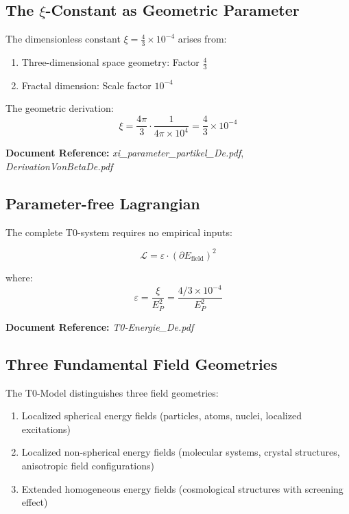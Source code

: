 \documentclass[12pt,a4paper]{article}
\newcommand{\xipar}{\xi}
\newcommand{\Efield}{E_{\text{field}}}
\begin{document}
	\subsection{The $\xipar$-Constant as Geometric Parameter}
	
	The dimensionless constant $\xipar = \frac{4}{3} \times 10^{-4}$ arises from:
	
	\begin{enumerate}
		\item Three-dimensional space geometry: Factor $\frac{4}{3}$
		\item Fractal dimension: Scale factor $10^{-4}$
	\end{enumerate}
	
	The geometric derivation:
	\begin{equation}
		\xipar = \frac{4\pi}{3} \cdot \frac{1}{4\pi \times 10^4} = \frac{4}{3} \times 10^{-4}
	\end{equation}
	
	\textbf{Document Reference:} \textit{xi\_parameter\_partikel\_De.pdf}, \textit{DerivationVonBetaDe.pdf}
	
	\subsection{Parameter-free Lagrangian}
	
	The complete T0-system requires no empirical inputs:
	
	\begin{equation}
		\mathcal{L} = \varepsilon \cdot (\partial \Efield)^2
	\end{equation}
	
	where:
	\begin{equation}
		\varepsilon = \frac{\xipar}{E_P^2} = \frac{4/3 \times 10^{-4}}{E_P^2}
	\end{equation}
	
	\textbf{Document Reference:} \textit{T0-Energie\_De.pdf}
	
	\subsection{Three Fundamental Field Geometries}
	
	The T0-Model distinguishes three field geometries:
	
	\begin{enumerate}
		\item Localized spherical energy fields (particles, atoms, nuclei, localized excitations)
		\item Localized non-spherical energy fields (molecular systems, crystal structures, anisotropic field configurations)
		\item Extended homogeneous energy fields (cosmological structures with screening effect)
	\end{enumerate}
	
\end{document}
